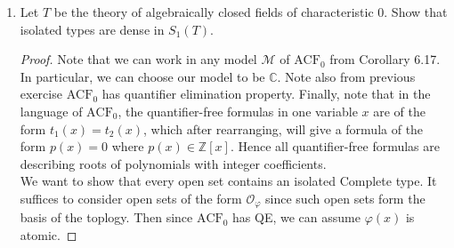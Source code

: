 \documentclass{article}
\begin{document}
\begin{enumerate}[label={\bf Q\arabic*:}]
  \item Let $T$ be the theory of algebraically closed fields of
    characteristic 0. Show that isolated types are dense in $S_1(T)$.
    \begin{proof}
      Note that we can work in any model $\mathcal{M}$ of $\text{ACF}_0$
      from Corollary 6.17. In particular, we can choose our model to be
      $\mathbb{C}$. Note also from previous exercise $\text{ACF}_0$ has
      quantifier elimination property. Finally, note that in the language
      of $\text{ACF}_0$, the quantifier-free formulas in one variable $x$
      are of the form $t_1(x)=t_2(x)$, which after rearranging, will give a
      formula of the form $p(x)=0$ where
      $p(x)\in\mathbb{Z}[x]$. Hence all
      quantifier-free formulas are describing roots of polynomials with
      integer coefficients. \\

      We want to show that every open set contains an isolated Complete
      type. It suffices to consider open sets of the form
      $\mathcal{O}_\varphi$ since such open sets form the basis of the
      toplogy. Then since $\text{ACF}_0$ has QE, we can assume $\varphi(x)$
      is atomic.
    \end{proof}
\end{enumerate}
\end{document}
